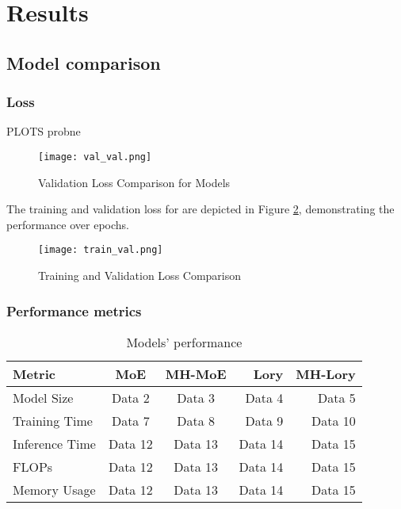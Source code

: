 \documentclass[12pt]{article}
\begin{document}
\section{Results}

\subsection{Model comparison}
\subsubsection{Loss}
 PLOTS probne

\begin{figure}[H]
    \centering
    \texttt{[image: val\_val.png]}
    \caption{Validation Loss Comparison for Models}
    \label{fig:validation_loss}
\end{figure}

The training and validation loss for are depicted in Figure \ref{fig:train_val_loss}, demonstrating the performance over epochs.

\begin{figure}[H]
    \centering
    \texttt{[image: train\_val.png]}
    \caption{Training and Validation Loss Comparison}
    \label{fig:train_val_loss}
\end{figure}

\subsubsection{Performance metrics}

\begin{table}[h!]
\centering
\begin{tabular}{|l|c|c|r|r|}
\hline
Metric & \textbf{MoE} & \textbf{MH-MoE} & \textbf{Lory} & \textbf{MH-Lory} \\
\hline
Model Size & Data 2 & Data 3 & Data 4 & Data 5 \\
Training Time & Data 7 & Data 8 & Data 9 & Data 10 \\
Inference Time  & Data 12 & Data 13 & Data 14 & Data 15 \\
FLOPs & Data 12 & Data 13 & Data 14 & Data 15 \\
Memory Usage & Data 12 & Data 13 & Data 14 & Data 15 \\

\hline
\end{tabular}
\caption{Models' performance}
\label{tab:performance_table}
\end{table}
\end{document}
